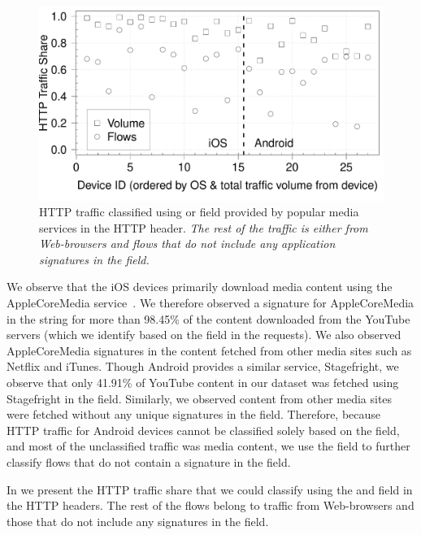 \begin{figure}
\includegraphics[width=\columnwidth]{plots/appusage_someappservicesig_traffic.pdf}
\caption{HTTP traffic classified using \useragent or \httphost field provided by popular media services in the HTTP header. \emph{The rest of the traffic is either from Web-browsers and flows that do not include any application signatures in the \useragent field.}}
\label{fig:http-classification-app-user-agent-host}
\end{figure}

We observe that the iOS devices primarily download media content using the AppleCoreMedia service~\cite{apple:coremedia}.
We therefore observed a signature for AppleCoreMedia in the \useragent string for more than 98.45\% of the content downloaded from the YouTube servers (which we identify based on the \httphost field in the \httpget requests). 
We also observed AppleCoreMedia signatures in the content fetched from other media sites such as Netflix and iTunes.
Though Android provides a similar service, Stagefright\cite{android:stagefright}, we observe that only 41.91\% of YouTube content in our dataset was fetched using Stagefright in the \useragent field. 
Similarly, we observed content from other media sites were fetched without any unique signatures in the \useragent field. 
Therefore, because HTTP traffic for Android devices cannot be classified solely based on the \useragent field, and most of the unclassified traffic was media content, we use the \httphost field to further classify flows that do not contain a signature in the \useragent field. 

In  we present the HTTP traffic share that we could classify using the \useragent and \httphost field in the HTTP headers. 
The rest of the flows belong to traffic from Web-browsers and those that do not include any signatures in the \useragent field. 

